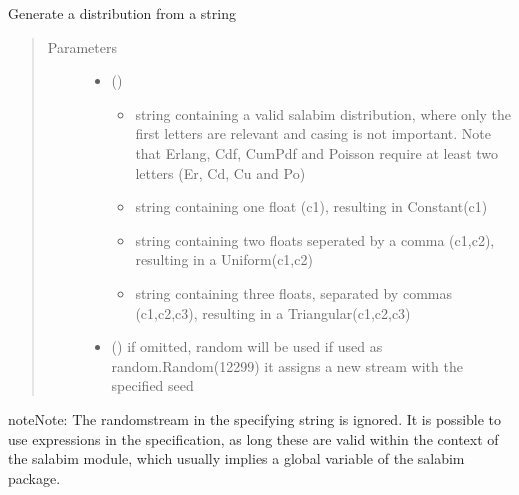 \documentclass[letterpaper,10pt,english]{sphinxmanual}
\begin{document}

\begin{fulllineitems}
\label{\detokenize{Reference:salabim.Distribution}}
Generate a distribution from a string
\begin{quote}\begin{description}
\item[{Parameters}] \leavevmode\begin{itemize}
\item {} 
 () \textendash{} \begin{itemize}
\item {} 
string containing a valid salabim distribution, where only the first
letters are relevant and casing is not important. Note that Erlang,
Cdf, CumPdf and Poisson require at least two letters
(Er, Cd, Cu and Po)

\item {} 
string containing one float (c1), resulting in Constant(c1)

\item {} 
string containing two floats seperated by a comma (c1,c2),
resulting in a Uniform(c1,c2)

\item {} 
string containing three floats, separated by commas (c1,c2,c3),
resulting in a Triangular(c1,c2,c3)

\end{itemize}


\item {} 
 () \textendash{} if omitted, random will be used 
if used as random.Random(12299)
it assigns a new stream with the specified seed 

\end{itemize}

\end{description}\end{quote}

\begin{sphinxadmonition}{note}{Note:}
The randomstream in the specifying string is ignored. 
It is possible to use expressions in the specification, as long these
are valid within the context of the salabim module, which usually implies
a global variable of the salabim package.
\end{sphinxadmonition}

\end{fulllineitems}
\end{document}
